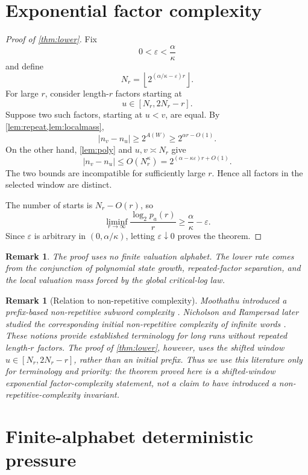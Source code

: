 \documentclass[11pt]{amsart}
\newtheorem{remark}[theorem]{Remark}
\begin{document}
\section{Exponential factor complexity}

\begin{proof}[Proof of \cref{thm:lower}]
Fix
\[
 0<\varepsilon<\frac{\alpha}{\kappa}
\]
and define
\[
 N_r=\left\lfloor2^{(\alpha/\kappa-\varepsilon)r}\right\rfloor.
\]
For large \(r\), consider length-\(r\) factors starting at
\[
 u\in[N_r,2N_r-r].
\]
Suppose two such factors, starting at \(u<v\), are equal.  By \cref{lem:repeat,lem:localmass},
\[
 |n_v-n_u|
 \ge2^{A(W)}
 \ge2^{\alpha r-O(1)}.
\]
On the other hand, \cref{lem:poly} and \(u,v\asymp N_r\) give
\[
 |n_v-n_u|
 \le O(N_r^\kappa)
 =2^{(\alpha-\kappa\varepsilon)r+O(1)}.
\]
The two bounds are incompatible for sufficiently large \(r\).  Hence all factors in the selected window are distinct.

The number of starts is \(N_r-O(r)\), so
\[
 \liminf_{r\to\infty}
 \frac{\log_2p_a(r)}r
 \ge\frac{\alpha}{\kappa}-\varepsilon.
\]
Since \(\varepsilon\) is arbitrary in \((0,\alpha/\kappa)\), letting \(\varepsilon\downarrow0\) proves the theorem.
\end{proof}

\begin{remark}
The proof uses no finite valuation alphabet.  The lower rate comes from the conjunction of polynomial state growth, repeated-factor separation, and the local valuation mass forced by the global critical-log law.
\end{remark}

\begin{remark}[Relation to non-repetitive complexity]\label{rem:nonrepetitive}
Moothathu introduced a prefix-based non-repetitive subword complexity \cite{Moothathu2012}.  Nicholson and Rampersad later studied the corresponding \emph{initial non-repetitive complexity} of infinite words \cite{NicholsonRampersad2016}.  These notions provide established terminology for long runs without repeated length-\(r\) factors.  The proof of \cref{thm:lower}, however, uses the shifted window \(u\in[N_r,2N_r-r]\), rather than an initial prefix.  Thus we use this literature only for terminology and priority: the theorem proved here is a shifted-window exponential factor-complexity statement, not a claim to have introduced a non-repetitive-complexity invariant.
\end{remark}

\section{Finite-alphabet deterministic pressure}\label{sec:finitepressure}
\end{document}
